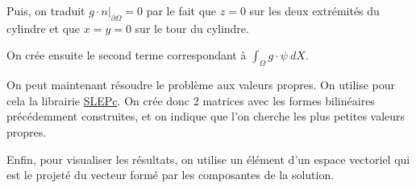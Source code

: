 %


Puis, on traduit $g\cdot n\big\rvert_{\partial\Omega}=0$ par le fait que $z=0$ sur les deux extrémités du cylindre et que $x=y=0$ sur le tour du cylindre.

%


On crée ensuite le second terme correspondant à $\int_\Omega g\cdot\psi\ dX$.

%


On peut maintenant résoudre le problème aux valeurs propres. On utilise pour cela la librairie \href{http://www.grycap.upv.es/slepc/}{SLEPc}. On crée donc 2 matrices avec les formes bilinéaires précédemment construites, et on indique que l'on cherche les plus petites valeurs propres.

%


Enfin, pour visualiser les résultats, on utilise un élément d'un espace vectoriel qui est le projeté du vecteur formé par les composantes de la solution.

%

